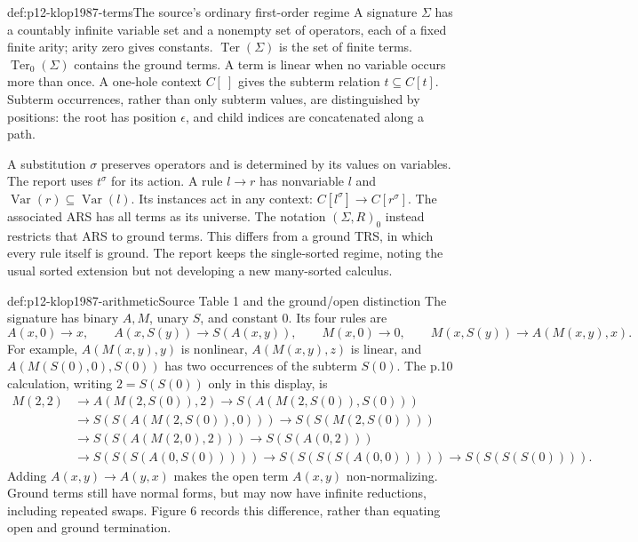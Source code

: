 \begin{hbdefinition}{def:p12-klop1987-terms}{The source's ordinary first-order regime}
A signature \(\Sigma\) has a countably infinite variable set and a nonempty
set of operators, each of a fixed finite arity; arity zero gives constants.
\(\operatorname{Ter}(\Sigma)\) is the set of finite terms.
\(\operatorname{Ter}_0(\Sigma)\) contains the ground terms. A term is
linear when no variable occurs more than once. A one-hole context
\(C[\ ]\) gives the subterm relation \(t\subseteq C[t]\).
Subterm occurrences, rather than only subterm values, are distinguished
by positions: the root has position \(\epsilon\), and child indices
are concatenated along a path.

A substitution \(\sigma\) preserves operators and is determined by its
values on variables. The report uses \(t^\sigma\) for its action.
A rule \(l\to r\) has nonvariable \(l\) and
\(\operatorname{Var}(r)\subseteq\operatorname{Var}(l)\).
Its instances act in any context:
\(C[l^\sigma]\to C[r^\sigma]\).
The associated ARS has all terms as its universe. The notation
\((\Sigma,R)_0\) instead restricts that ARS to ground terms.
This differs from a ground TRS, in which every rule itself is ground.
The report keeps the single-sorted regime, noting the usual sorted
extension but not developing a new many-sorted calculus.
\end{hbdefinition}

\begin{hbexample}{def:p12-klop1987-arithmetic}{Source Table 1 and the ground/open distinction}
The signature has binary \(A,M\), unary \(S\), and constant \(0\).
Its four rules are
\[
 A(x,0)\to x,\qquad A(x,S(y))\to S(A(x,y)),\qquad
 M(x,0)\to0,\qquad M(x,S(y))\to A(M(x,y),x).
\]
For example, \(A(M(x,y),y)\) is nonlinear,
\(A(M(x,y),z)\) is linear, and
\(A(M(S(0),0),S(0))\) has two occurrences of the subterm \(S(0)\).
The p.10 calculation, writing \(2=S(S(0))\) only in this display, is
\begin{align*}
 M(2,2)&\to A(M(2,S(0)),2)
 \to S(A(M(2,S(0)),S(0)))\\
 &\to S(S(A(M(2,S(0)),0)))\to S(S(M(2,S(0))))\\
 &\to S(S(A(M(2,0),2)))\to S(S(A(0,2)))\\
 &\to S(S(S(A(0,S(0)))))\to S(S(S(S(A(0,0)))))
 \to S(S(S(S(0)))).
\end{align*}
Adding \(A(x,y)\to A(y,x)\) makes the open term \(A(x,y)\)
non-normalizing. Ground terms still have normal forms, but may now have
infinite reductions, including repeated swaps. Figure 6 records this
difference, rather than equating open and ground termination.
\end{hbexample}

